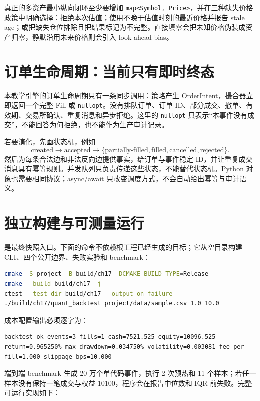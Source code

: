 真正的多资产最小纵向闭环至少要增加 \texttt{map<Symbol, Price>}，并在三种缺失价格政策中明确选择：拒绝本次估值；使用不晚于估值时刻的最近价格并报告 stale age；或把缺失仓位排除且把结果标记为不完整。直接填零会把未知价格伪装成资产归零，静默沿用未来价格则会引入 look-ahead bias。

\section{订单生命周期：当前只有即时终态}

本教学引擎的订单生命周期只有一条同步调用：策略产生 OrderIntent，撮合器立即返回一个完整 Fill 或 \texttt{nullopt}。没有排队订单、订单 ID、部分成交、撤单、有效期、交易所确认、重复消息和异步拒绝。这里的 \texttt{nullopt} 只表示“本事件没有成交”，不能回答为何拒绝，也不能作为生产审计记录。

若要演化，先画状态机，例如
\[
\text{created}\rightarrow\text{accepted}\rightarrow
\{\text{partially-filled},\text{filled},\text{cancelled},\text{rejected}\}.
\]
然后为每条合法边和非法反向边提供事实，给订单与事件稳定 ID，并让重复成交消息具有幂等规则。并发队列只负责传递这些状态，不能替代状态机。Python 对象也需要相同协议；async/await 只改变调度方式，不会自动给出幂等与审计语义。

\section{独立构建与可测量运行}

 是最终快照入口。下面的命令不依赖根工程已经生成的目标；它从空目录构建 CLI、四个公开边界、失败实验和 benchmark：

\begin{lstlisting}[language=bash,numbers=none]
cmake -S project -B build/ch17 -DCMAKE_BUILD_TYPE=Release
cmake --build build/ch17 -j
ctest --test-dir build/ch17 --output-on-failure
./build/ch17/quant_backtest project/data/sample.csv 1.0 10.0
\end{lstlisting}

成本配置输出必须逐字为：
\begin{lstlisting}[numbers=none]
backtest-ok events=3 fills=1 cash=7521.525 equity=10096.525 return=0.965250% max-drawdown=0.034750% volatility=0.003081 fee-per-fill=1.000 slippage-bps=10.000
\end{lstlisting}

端到端 benchmark 生成 20 万个单代码事件，执行 2 次预热和 11 个样本；若任一样本没有保持一笔成交与权益 10100，程序会在报告中位数和 IQR 前失败。完整可运行实现如下：

